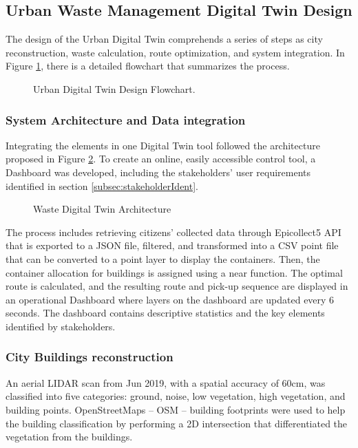 \documentclass[authoryear,preprint,review,12pt]{elsarticle}
\begin{document}
    \subsection{Urban Waste Management Digital Twin Design} \label{subsec:Phase3}
    The design of the Urban Digital Twin comprehends a series of steps as city reconstruction, waste calculation, route optimization, and system integration. In Figure \ref{fig:flowchart}, there is a detailed flowchart that summarizes the process.

    \begin{figure}
        \caption{Urban Digital Twin Design Flowchart.}
        \label{fig:flowchart}
    \end{figure}

    \subsubsection{System Architecture and Data integration}\label{subsubsec:SystemArch}
    Integrating the elements in one Digital Twin tool followed the architecture proposed in Figure \ref{fig:architecture}. To create an online, easily accessible control tool, a Dashboard was developed, including the stakeholders’ user requirements identified in section \ref{subsec:stakeholderIdent}.
    \begin{figure}
        \caption{Waste Digital Twin Architecture}
        \label{fig:architecture}
    \end{figure}
    The process includes retrieving citizens' collected data through Epicollect5 API that is exported to a JSON file, filtered, and transformed into a CSV point file that can be converted to a point layer to display the containers. Then, the container allocation for buildings is assigned using a near function. The optimal route is calculated, and the resulting route and pick-up sequence are displayed in an operational Dashboard where layers on the dashboard are updated every 6 seconds. The dashboard contains descriptive statistics and the key elements identified by stakeholders.

    \subsubsection{City Buildings reconstruction}\label{subsubsec:Buildings}
    An aerial LIDAR scan from Jun 2019, with a spatial accuracy of 60cm, was classified into five categories: ground, noise, low vegetation, high vegetation, and building points. OpenStreetMaps – OSM – building footprints \citep{contributorsPlanetDumpRetrieved2023} were used to help the building classification by performing a 2D intersection that differentiated the vegetation from the buildings.
\end{document}
